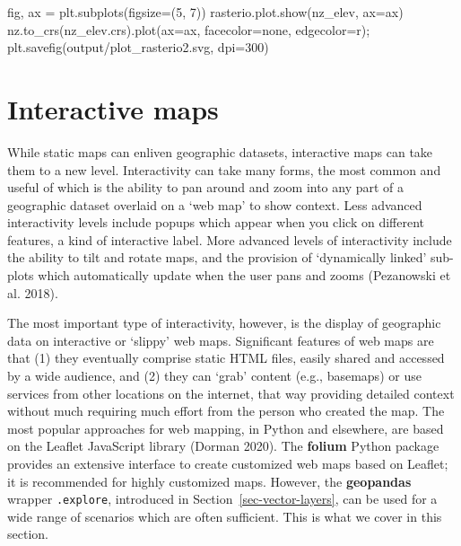 \documentclass[
  letterpaper,
]{krantz}
\newenvironment{Shaded}{\begin{snugshade}}{\end{snugshade}}
\newcommand{\DecValTok}[1]{\textcolor[rgb]{0.68,0.00,0.00}{#1}}
\newcommand{\NormalTok}[1]{\textcolor[rgb]{0.00,0.23,0.31}{#1}}
\newcommand{\OperatorTok}[1]{\textcolor[rgb]{0.37,0.37,0.37}{#1}}
\newcommand{\StringTok}[1]{\textcolor[rgb]{0.13,0.47,0.30}{#1}}
\begin{document}
\begin{Shaded}
\begin{Highlighting}[]
\NormalTok{fig, ax }\OperatorTok{=}\NormalTok{ plt.subplots(figsize}\OperatorTok{=}\NormalTok{(}\DecValTok{5}\NormalTok{, }\DecValTok{7}\NormalTok{))}
\NormalTok{rasterio.plot.show(nz\_elev, ax}\OperatorTok{=}\NormalTok{ax)}
\NormalTok{nz.to\_crs(nz\_elev.crs).plot(ax}\OperatorTok{=}\NormalTok{ax, facecolor}\OperatorTok{=}\StringTok{\textquotesingle{}none\textquotesingle{}}\NormalTok{, edgecolor}\OperatorTok{=}\StringTok{\textquotesingle{}r\textquotesingle{}}\NormalTok{)}\OperatorTok{;}
\NormalTok{plt.savefig(}\StringTok{\textquotesingle{}output/plot\_rasterio2.svg\textquotesingle{}}\NormalTok{, dpi}\OperatorTok{=}\DecValTok{300}\NormalTok{)}
\end{Highlighting}
\end{Shaded}

\section{Interactive maps}\label{sec-interactive-maps}

While static maps can enliven geographic datasets, interactive maps can
take them to a new level. Interactivity can take many forms, the most
common and useful of which is the ability to pan around and zoom into
any part of a geographic dataset overlaid on a `web map' to show
context. Less advanced interactivity levels include popups which appear
when you click on different features, a kind of interactive label. More
advanced levels of interactivity include the ability to tilt and rotate
maps, and the provision of `dynamically linked' sub-plots which
automatically update when the user pans and zooms (Pezanowski et al.
2018).

The most important type of interactivity, however, is the display of
geographic data on interactive or `slippy' web maps. Significant
features of web maps are that (1) they eventually comprise static HTML
files, easily shared and accessed by a wide audience, and (2) they can
`grab' content (e.g., basemaps) or use services from other locations on
the internet, that way providing detailed context without much requiring
much effort from the person who created the map. The most popular
approaches for web mapping, in Python and elsewhere, are based on the
Leaflet JavaScript library (Dorman 2020). The \textbf{folium} Python
package provides an extensive interface to create customized web maps
based on Leaflet; it is recommended for highly customized maps. However,
the \textbf{geopandas} wrapper \texttt{.explore}, introduced in
Section~\ref{sec-vector-layers}, can be used for a wide range of
scenarios which are often sufficient. This is what we cover in this
section.
\end{document}
